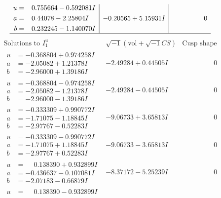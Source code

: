 \documentclass[1p]{elsarticle_modified}
\theoremstyle{definition}
\newcommand{\I}{\sqrt{-1}}
\begin{document}
$$\begin{array}{c|c|c}
\begin{aligned}
u &= \phantom{-}0.755664 - 0.592081 I \\
a &= \phantom{-}0.44078 - 2.25804 I \\
b &= \phantom{-}0.232245 - 1.140070 I\end{aligned}
 & -0.20565 + 5.15931 I & \phantom{-0.000000 } 0\\
 \hline 
 \end{array}$$\newpage$$\begin{array}{c|c|c}  
\text{Solutions to }I^u_{1}& \I (\text{vol} + \sqrt{-1}CS) & \text{Cusp shape}\\
 \hline 
\begin{aligned}
u &= -0.368804 + 0.974258 I \\
a &= -2.05082 + 1.21378 I \\
b &= -2.96000 + 1.39186 I\end{aligned}
 & -2.49284 + 0.44505 I & \phantom{-0.000000 } 0 \\ \hline\begin{aligned}
u &= -0.368804 - 0.974258 I \\
a &= -2.05082 - 1.21378 I \\
b &= -2.96000 - 1.39186 I\end{aligned}
 & -2.49284 - 0.44505 I & \phantom{-0.000000 } 0 \\ \hline\begin{aligned}
u &= -0.333309 + 0.990772 I \\
a &= -1.71075 - 1.18845 I \\
b &= -2.97767 - 0.52283 I\end{aligned}
 & -9.06733 + 3.65813 I & \phantom{-0.000000 } 0 \\ \hline\begin{aligned}
u &= -0.333309 - 0.990772 I \\
a &= -1.71075 + 1.18845 I \\
b &= -2.97767 + 0.52283 I\end{aligned}
 & -9.06733 - 3.65813 I & \phantom{-0.000000 } 0 \\ \hline\begin{aligned}
u &= \phantom{-}0.138390 + 0.932899 I \\
a &= -0.436637 - 0.107081 I \\
b &= -2.07183 - 0.66879 I\end{aligned}
 & -8.37172 - 5.25239 I & \phantom{-0.000000 } 0 \\ \hline\begin{aligned}
u &= \phantom{-}0.138390 - 0.932899 I \\

\end{aligned}
\end{array}$$
\end{document}
